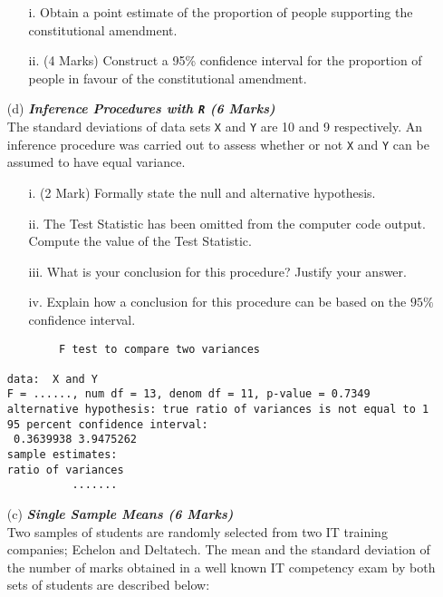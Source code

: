 \documentclass[]{article}
\begin{document}
\begin{itemize}
\begin{itemize}
\item [i.] Obtain a point estimate of the proportion of people supporting the constitutional amendment.
\item [ii.](4 Marks) Construct a 95\% confidence interval for the proportion of people in favour of the constitutional amendment.
\end{itemize}

\item[(d)] \textbf{\textit{Inference Procedures with \texttt{R} (6 Marks)}}\\
The standard deviations of data sets \texttt{X} and \texttt{Y} are 10 and 9 respectively. An inference procedure was carried out to assess whether or not \texttt{X} and \texttt{Y} can be assumed to have equal variance.
\begin{itemize}
\item[i.](2 Mark) Formally state the null and alternative hypothesis.
\item[ii.] The Test Statistic has been omitted from the computer code output. Compute the value of the Test Statistic.
\item[iii.] What is your conclusion for this procedure? Justify your answer.
\item[iv.]  Explain how a conclusion for this procedure can be based on the $95\%$ confidence interval.
\end{itemize}

\begin{framed}
\begin{verbatim}
        F test to compare two variances

data:  X and Y
F = ......, num df = 13, denom df = 11, p-value = 0.7349
alternative hypothesis: true ratio of variances is not equal to 1
95 percent confidence interval:
 0.3639938 3.9475262
sample estimates:
ratio of variances
          .......
\end{verbatim}
\end{framed}

\item[(c)] \textbf{\textit{Single Sample Means (6 Marks)}}\\
Two samples of students are randomly selected from two IT training companies; Echelon and Deltatech. The mean and the standard deviation of the number of marks obtained in a well known IT competency exam by both sets of students are described below:\\


\end{itemize}
\end{document}
